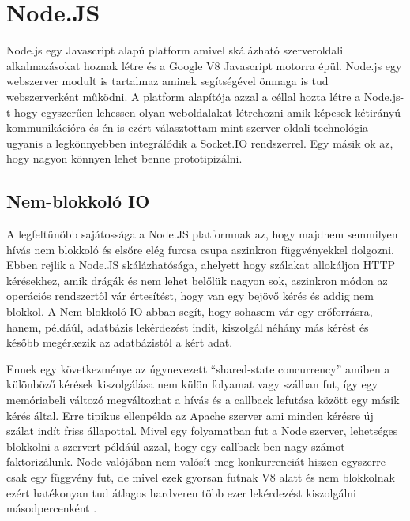 \section{Node.JS}

Node.js egy Javascript alapú platform amivel skálázható szerveroldali alkalmazásokat hoznak létre és a Google V8 Javascript motorra épül. Node.js egy webszerver modult is tartalmaz aminek segítségével önmaga is tud webszerverként működni. A platform alapítója azzal a céllal hozta létre a Node.js-t hogy egyszerűen lehessen olyan weboldalakat létrehozni amik képesek kétirányú kommunikációra és én is ezért választottam mint szerver oldali technológia ugyanis a legkönnyebben integrálódik a Socket.IO rendszerrel.  Egy másik ok az, hogy nagyon könnyen lehet benne prototipizálni.



\subsection{Nem-blokkoló IO}

A legfeltűnőbb sajátossága a Node.JS platformnak az, hogy majdnem semmilyen hívás nem blokkoló és elsőre elég furcsa csupa aszinkron függvényekkel dolgozni. Ebben rejlik a Node.JS skálázhatósága, ahelyett hogy szálakat allokáljon HTTP kérésekhez, amik drágák és nem lehet belőlük nagyon sok, aszinkron módon az operációs rendszertől vár értesítést, hogy van egy bejövő kérés és addig nem blokkol. A Nem-blokkoló IO abban segít, hogy sohasem vár egy erőforrásra, hanem, példáúl, adatbázis lekérdezést indít, kiszolgál néhány más kérést és később megérkezik az adatbázistól a kért adat. 

Ennek egy következménye az úgynevezett ``shared-state concurrency'' amiben a különböző kérések kiszolgálása nem külön folyamat vagy szálban fut, így egy memóriabeli változó megváltozhat a hívás és a callback lefutása között egy másik kérés által. Erre tipikus ellenpélda az Apache szerver ami minden kérésre új szálat indít friss állapottal. Mivel egy folyamatban fut a Node szerver, lehetséges blokkolni a szervert példáúl azzal, hogy egy callback-ben nagy számot faktorizálunk. Node valójában nem valósít meg konkurrenciát hiszen egyszerre csak egy függvény fut, de mivel ezek gyorsan futnak V8 alatt és nem blokkolnak ezért hatékonyan tud átlagos hardveren több ezer lekérdezést kiszolgálni másodpercenként \cite{nodebook}.

